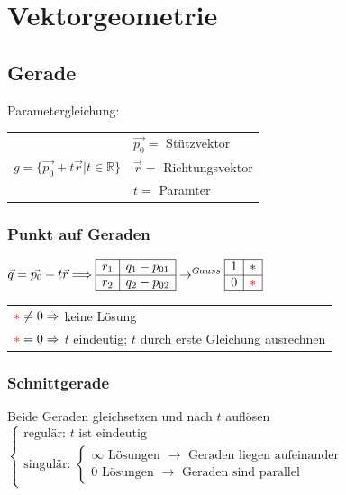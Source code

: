 \section{Vektorgeometrie}

\subsection{Gerade}
	Parametergleichung: \begin{tabular}{ll}
		& $\vec{p_0} = $ Stützvektor \\
		$g = \lbrace\vec{p_0} + t\vec{r} | t \in \mathbb{R}\rbrace$ & $\vec{r} = $ Richtungsvektor \\
		& $t = $ Paramter
	\end{tabular}

	\subsubsection{Punkt auf Geraden}
		$\vec{q} = \vec{p_0} + t\vec{r} \Longrightarrow \begin{array}{|c|c|}
			\hline r_1 & q_1 - p_{01}\\
			\hline r_2 & q_2 - p_{02}\\
			\hline \end{array} \rightarrow^{Gauss} 
		\begin{array}{|c|c|}
			\hline 1 & * \\
			\hline 0 & \color{red}*\\
			\hline \end{array}$ \qquad 
		\begin{tabular}{l}
			${\color{red}*} \neq 0 \Rightarrow$ keine Lösung\\
			${\color{red}*} = 0 \Rightarrow$ $t$ eindeutig; $t$ durch erste Gleichung ausrechnen
		\end{tabular}
	
	\subsubsection{Schnittgerade}
		Beide Geraden gleichsetzen und nach $t$ auflösen $\left\lbrace\begin{array}{l}
			\text{regulär: } t \text{ ist eindeutig}\\
			\text{singulär: } \left\lbrace\begin{array}{l}
				\infty \text{ Lösungen } \rightarrow \text{ Geraden liegen aufeinander}\\
				0 \text{ Lösungen } \rightarrow \text{ Geraden sind parallel}
			\end{array}\right.
		\end{array}\right.$


